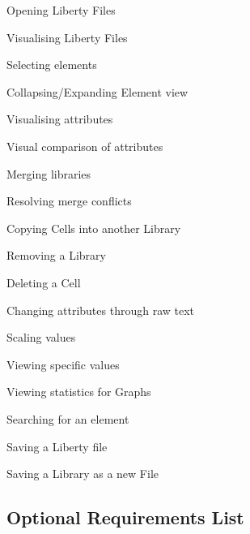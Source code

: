 \documentclass[10pt,a4paper]{report}
\begin{document}
\begin{FR}
    \item Opening Liberty Files \label{FR-1}
    \item Visualising Liberty Files \label{FR-2}
    \item Selecting elements \label{FR-3} %
    \item Collapsing/Expanding Element view \label{FR-4.5} %
    \item Visualising attributes \label{FR-4}
    \item Visual comparison of attributes \label{FR-5}
    \item Merging libraries \label{FR-6}
    \item Resolving merge conflicts \label{FR-7}
    \item Copying Cells into another Library\label{FR-8}
    \item Removing a Library \label{FR-9}
    \item Deleting a Cell \label{FR-10}
    \item Changing attributes through raw text \label{FR-11}
    \item Scaling values \label{FR-12}
    \item Viewing specific values \label{FR-13}
    \item Viewing statistics for Graphs \label{FR-14}
    \item Searching for an element \label{FR-15}
    \item Saving a Liberty file \label{FR-16}
    \item Saving a Library as a new File \label{FR-17}
\end{FR}
\subsection{Optional Requirements List}
\end{document}
